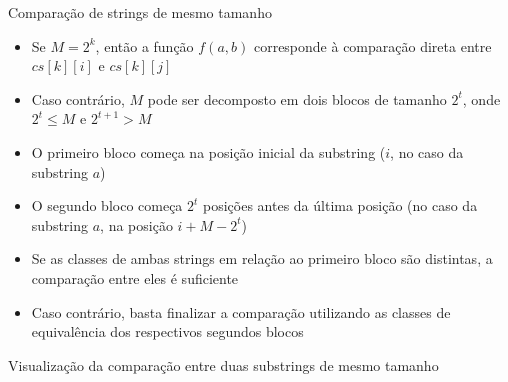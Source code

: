 \begin{frame}[fragile]{Comparação de strings de mesmo tamanho}

    \begin{itemize}
        \item Se $M = 2^k$, então a função $f(a, b)$ corresponde à comparação direta entre
            $cs[k][i]$ e $cs[k][j]$

        \item Caso contrário, $M$ pode ser decomposto em dois blocos de tamanho $2^t$, onde
            $2^t \leq M$ e $2^{t + 1} > M$

        \item O primeiro bloco começa na posição inicial da substring ($i$, no caso da substring
            $a$)

        \item O segundo bloco começa $2^t$ posições antes da última posição (no caso da substring
            $a$, na posição $i + M - 2^t$)

        \item Se as classes de ambas strings em relação ao primeiro bloco são distintas, 
            a comparação entre eles é suficiente

        \item Caso contrário, basta finalizar a comparação utilizando as classes de equivalência
            dos respectivos segundos blocos
    \end{itemize}

\end{frame}

\begin{frame}[fragile]{Visualização da comparação entre duas substrings de mesmo tamanho}

    \begin{figure}
        \centering


    \end{figure}

\end{frame}

